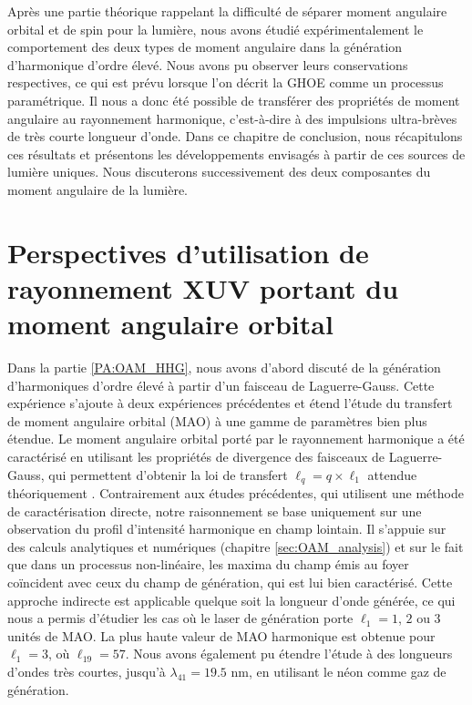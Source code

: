 \renewcommand{\thesection}{\Roman{section}}
\setcounter{section}{0}
\renewcommand{\theHsection}{CL.\the\value{section}}
\renewcommand{\thefigure}{\Roman{section}.\arabic{figure}}
\renewcommand{\theHfigure}{CL.\Roman{section}.\arabic{figure}}
\setcounter{figure}{0}

\makeatletter
\def\toclevel@chapter{-1}
\def\toclevel@section{0}
\def\toclevel@subsection{1}
\makeatother

Après une partie théorique rappelant la difficulté de séparer moment angulaire orbital et de spin pour la lumière, nous avons étudié expérimentalement le comportement des deux types de moment angulaire dans la génération d'harmonique d'ordre élevé. Nous avons pu observer leurs conservations respectives, ce qui est prévu lorsque l'on décrit la GHOE comme un processus paramétrique. Il nous a donc été possible de transférer des propriétés de moment angulaire au rayonnement harmonique, c'est-à-dire à des impulsions ultra-brèves de très courte longueur d'onde. Dans ce chapitre de conclusion, nous récapitulons ces résultats et présentons les développements envisagés à partir de ces sources de lumière uniques. Nous discuterons successivement des deux composantes du moment angulaire de la lumière.

\section{Perspectives d'utilisation de rayonnement XUV portant du moment angulaire orbital}
Dans la partie \ref{PA:OAM_HHG}, nous avons d'abord discuté de la génération d'harmoniques d'ordre élevé à partir d'un faisceau de Laguerre-Gauss. Cette expérience s'ajoute à deux expériences précédentes  et étend l'étude du transfert de moment angulaire orbital (MAO) à une gamme de paramètres bien plus étendue. Le moment angulaire orbital porté par le rayonnement harmonique a été caractérisé en utilisant les propriétés de divergence des faisceaux de Laguerre-Gauss, qui permettent d'obtenir la loi de transfert $\ell_q=q\times\ell_1$ attendue théoriquement . Contrairement aux études précédentes, qui utilisent une méthode de caractérisation directe, notre raisonnement se base uniquement sur une observation du profil d'intensité harmonique en champ lointain. Il s'appuie sur des calculs analytiques et numériques (chapitre \ref{sec:OAM_analysis}) et sur le fait que dans un processus non-linéaire, les maxima du champ émis au foyer coïncident avec ceux du champ de génération, qui est lui bien caractérisé. Cette approche indirecte est applicable quelque soit la longueur d'onde générée, ce qui nous a permis d'étudier les cas où le laser de génération porte $\ell_1=1$, $2$ ou $3$ unités de MAO. La plus haute valeur de MAO harmonique est obtenue pour $\ell_1=3$, où $\ell_{19} = 57$. Nous avons également pu étendre l'étude à des longueurs d'ondes très courtes, jusqu'à $\lambda_{41} = 19.5$ nm, en utilisant le néon comme gaz de génération.

